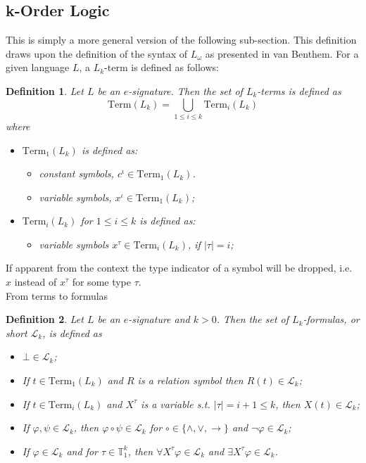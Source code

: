 \documentclass[11pt,a4paper]{article}
\newtheorem{mydef}{Definition}
\newcommand{\vanB}{van Benthem}
\begin{document}
\subsection*{k-Order Logic}
This is simply a more general version of the following sub-section.
This definition draws upon the definition of the syntax of $L_{\omega}$ as presented in \vanB. 
For a given language $L$, a $L_k$-term is defined as follows:
\begin{mydef}
Let $L$ be an $e$-signature. Then the set of $L_k$-terms is defined as
\begin{equation*}
\mathrm{Term}(L_k)=\bigcup_{1 \leq i \leq k} \mathrm{Term}_i(L_k)
\end{equation*}
where 
\begin{itemize}
\item $\mathrm{Term}_1(L_k)$ is defined as:
\begin{itemize}
\item  constant symbols, $c^{\iota} \in \mathrm{Term}_1(L_k)$.
\item  variable symbols, $x^{\iota} \in \mathrm{Term}_1(L_k)$;
\end{itemize} 
\item $\mathrm{Term}_i(L_k)$ for $1 \leq i \leq k$ is defined as:
\begin{itemize}
\item  variable symbols $x^{\tau} \in \mathrm{Term}_i(L_k)$, if $|\tau|=i$;
\end{itemize} 
\end{itemize} 
\end{mydef}

If apparent from the context the type indicator of a symbol will be dropped, i.e. $x$ instead of $x^{\tau}$ for some type $\tau$.\\

From terms to formulas
\begin{mydef}
Let $L$ be an $e$-signature and $k>0$. Then the set of $L_k$-formulas, or short $\mathcal{L}_k$, is defined as
\begin{itemize}
\item $\bot \in \mathcal{L}_k$;
\item If $t \in \mathrm{Term}_1(L_k)$ and $R$ is a relation symbol then $R(t)\in \mathcal{L}_k$;
\item If $t \in \mathrm{Term}_{i}(L_k)$ and $X^{\tau}$  is a variable s.t. $|\tau|=i+1 \leq k$,  then $X(t) \in \mathcal{L}_k$;
\item If $\varphi , \psi \in \mathcal{L}_k$, then $\varphi \circ \psi \in \mathcal{L}_k$ for $\circ \in \{\land, \lor , \to \}$ and $\neg \varphi \in \mathcal{L}_k$;
\item If $\varphi \in  \mathcal{L}_k$ and for $\tau \in \mathbb{T}_1^k$, then $\forall X^{\tau} \varphi \in \mathcal{L}_k$ and $\exists X^{\tau} \varphi \in \mathcal{L}_k$.
\end{itemize} 
\end{mydef}
\end{document}
